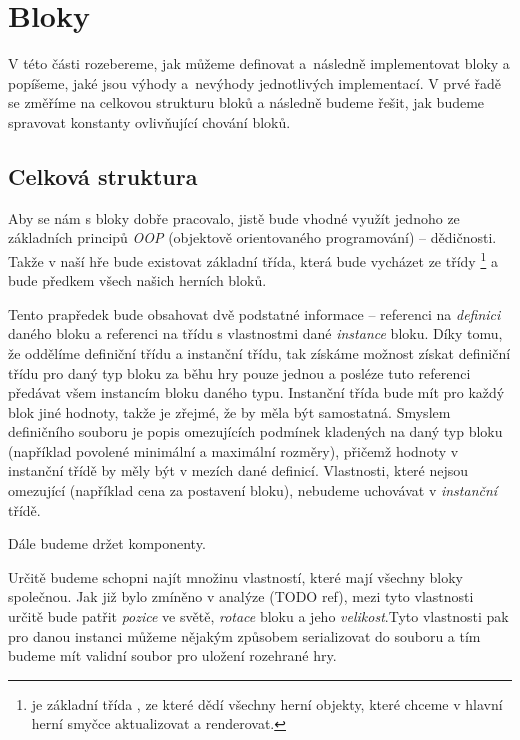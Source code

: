 
\section{Bloky}

V této části rozebereme, jak můžeme definovat a~následně implementovat bloky a popíšeme, jaké jsou výhody a~nevýhody jednotlivých implementací. V prvé řadě se změříme na celkovou strukturu bloků a následně budeme řešit, jak budeme spravovat konstanty ovlivňující chování bloků.

\subsection{Celková struktura}

Aby se nám s bloky dobře pracovalo, jistě bude vhodné využít jednoho ze základních principů \textit{OOP} (objektově orientovaného programování) -- dědičnosti. Takže v naší hře bude existovat základní třída, která bude vycházet ze třídy \footnote{ je základní třída \UEu{}, ze které dědí všechny herní objekty, které chceme v hlavní herní smyčce aktualizovat a renderovat.} a bude předkem všech našich herních bloků.

Tento prapředek bude obsahovat dvě podstatné informace -- referenci na \textit{definici} daného bloku a referenci na třídu s vlastnostmi dané \textit{instance} bloku. Díky tomu, že oddělíme definiční třídu a instanční třídu, tak získáme možnost získat definiční třídu pro daný typ bloku za běhu hry pouze jednou a posléze tuto referenci předávat všem instancím bloku daného typu. Instanční třída bude mít pro každý blok jiné hodnoty, takže je zřejmé, že by měla být samostatná. Smyslem definičního souboru je popis omezujících podmínek kladených na daný typ bloku (například povolené minimální a maximální rozměry), přičemž hodnoty v instanční třídě by měly být v mezích dané definicí. Vlastnosti, které nejsou omezující (například cena za postavení bloku), nebudeme uchovávat v \textit{instanční} třídě.

Dále budeme držet komponenty.

Určitě budeme schopni najít množinu vlastností, které mají všechny bloky společnou. Jak již bylo zmíněno v analýze (TODO ref), mezi tyto vlastnosti určitě bude patřit  \textit{pozice} ve světě, \textit{rotace} bloku a jeho \textit{velikost}.Tyto vlastnosti pak pro danou instanci můžeme nějakým způsobem serializovat do souboru a tím budeme mít validní soubor pro uložení rozehrané hry. 

